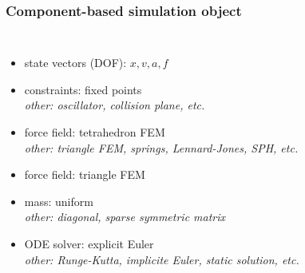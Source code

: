 \documentclass[a4paper,compress]{beamer}
\begin{document}
\begin{frame}
\frametitle{Component-based simulation object }
\begin{columns}
\begin{itemize}
\item<1-> state vectors (DOF): $x,v,a,f$
\item<1-> constraints: fixed points 
 {\\ \em other: oscillator, collision plane, etc.}
\item<2-> force field: tetrahedron FEM
 {\\ \em other: triangle FEM, springs, Lennard-Jones, SPH, etc.}
\item<3-> force field: triangle FEM
\item<4-> mass: uniform
 {\\ \em other: diagonal, sparse symmetric matrix}
\item<5-> ODE solver: explicit Euler
 {\\ \em other: Runge-Kutta, implicite Euler, static solution, etc.}
\end{itemize}

\end{columns}
\end{frame}
\end{document}
